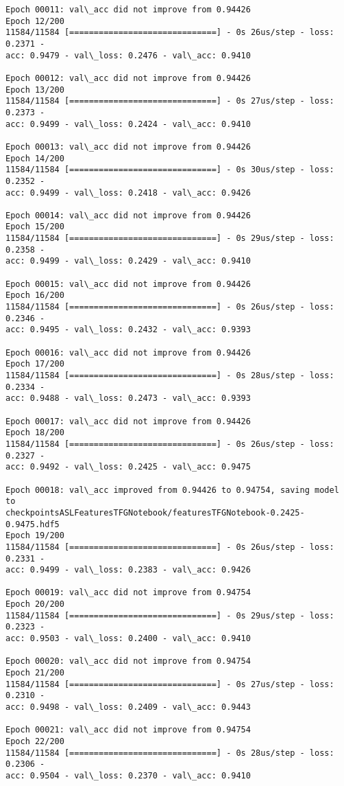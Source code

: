 \documentclass[11pt]{article}
\begin{document}
\begin{Verbatim}[commandchars=\\\{\}]
Epoch 00011: val\_acc did not improve from 0.94426
Epoch 12/200
11584/11584 [==============================] - 0s 26us/step - loss: 0.2371 -
acc: 0.9479 - val\_loss: 0.2476 - val\_acc: 0.9410

Epoch 00012: val\_acc did not improve from 0.94426
Epoch 13/200
11584/11584 [==============================] - 0s 27us/step - loss: 0.2373 -
acc: 0.9499 - val\_loss: 0.2424 - val\_acc: 0.9410

Epoch 00013: val\_acc did not improve from 0.94426
Epoch 14/200
11584/11584 [==============================] - 0s 30us/step - loss: 0.2352 -
acc: 0.9499 - val\_loss: 0.2418 - val\_acc: 0.9426

Epoch 00014: val\_acc did not improve from 0.94426
Epoch 15/200
11584/11584 [==============================] - 0s 29us/step - loss: 0.2358 -
acc: 0.9499 - val\_loss: 0.2429 - val\_acc: 0.9410

Epoch 00015: val\_acc did not improve from 0.94426
Epoch 16/200
11584/11584 [==============================] - 0s 26us/step - loss: 0.2346 -
acc: 0.9495 - val\_loss: 0.2432 - val\_acc: 0.9393

Epoch 00016: val\_acc did not improve from 0.94426
Epoch 17/200
11584/11584 [==============================] - 0s 28us/step - loss: 0.2334 -
acc: 0.9488 - val\_loss: 0.2473 - val\_acc: 0.9393

Epoch 00017: val\_acc did not improve from 0.94426
Epoch 18/200
11584/11584 [==============================] - 0s 26us/step - loss: 0.2327 -
acc: 0.9492 - val\_loss: 0.2425 - val\_acc: 0.9475

Epoch 00018: val\_acc improved from 0.94426 to 0.94754, saving model to
checkpointsASLFeaturesTFGNotebook/featuresTFGNotebook-0.2425-0.9475.hdf5
Epoch 19/200
11584/11584 [==============================] - 0s 26us/step - loss: 0.2331 -
acc: 0.9499 - val\_loss: 0.2383 - val\_acc: 0.9426

Epoch 00019: val\_acc did not improve from 0.94754
Epoch 20/200
11584/11584 [==============================] - 0s 29us/step - loss: 0.2323 -
acc: 0.9503 - val\_loss: 0.2400 - val\_acc: 0.9410

Epoch 00020: val\_acc did not improve from 0.94754
Epoch 21/200
11584/11584 [==============================] - 0s 27us/step - loss: 0.2310 -
acc: 0.9498 - val\_loss: 0.2409 - val\_acc: 0.9443

Epoch 00021: val\_acc did not improve from 0.94754
Epoch 22/200
11584/11584 [==============================] - 0s 28us/step - loss: 0.2306 -
acc: 0.9504 - val\_loss: 0.2370 - val\_acc: 0.9410


\end{Verbatim}
\end{document}
